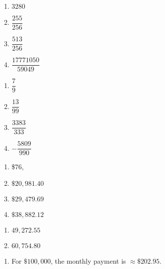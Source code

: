 \begin{multicols}{4}
\begin{enumerate}
\setcounter{enumi}{\value{HW}}

\item  $3280$

\item  $\dfrac{255}{256}$



\item $\dfrac{513}{256}$

\item $\dfrac{17771050}{59049}$

\setcounter{HW}{\value{enumi}}
\end{enumerate}
\end{multicols}

\begin{multicols}{4}
\begin{enumerate}
\setcounter{enumi}{\value{HW}}



\item $\dfrac{7}{9}$

\item $\dfrac{13}{99}$


\item $\dfrac{3383}{333}$
\item $-\dfrac{5809}{990}$

\setcounter{HW}{\value{enumi}}
\end{enumerate}
\end{multicols}

\begin{multicols}{4}
\begin{enumerate}
\setcounter{enumi}{\value{HW}}

\item \$76,
\item $\$20,\!981.40$

\item $\$29,\!479.69$

\item  $\$38,\!882.12$ 

\setcounter{HW}{\value{enumi}}
\end{enumerate}
\end{multicols}

\begin{multicols}{4}
\begin{enumerate}
\setcounter{enumi}{\value{HW}}


 

\item $49,\!272.55$

\item  $60,\!754.80$
 
\setcounter{HW}{\value{enumi}}
\end{enumerate}

\end{multicols}

\begin{enumerate}
\setcounter{enumi}{\value{HW}}

\item  For $\$100,\!000$, the monthly payment is $\approx \$202.95$.

\end{enumerate}
